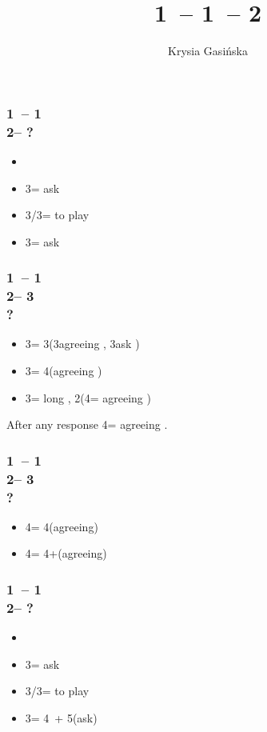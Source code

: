 \documentclass[12pt, a4paper]{report}
\title{1\diams\ -- 1\major\ -- 2\ntx}
\author{Krysia Gasińska}
\begin{document}
\maketitle

\subsubsection*{1\diams\ -- 1\hearts \\
                2\nt -- ?}
\begin{itemize}
    \item \pass
    \item 3\clubs = ask
    \item 3\diams/3\hearts = to play
    \item 3\spades = ask \clubs
\end{itemize}

\subsubsection*{1\diams\ -- 1\hearts \\
                2\nt -- 3\clubs\\
                ?}
\begin{itemize}
    \item 3\diams = 3\hearts (3\hearts agreeing \hearts, 3\spades ask \clubs)
    \item 3\hearts = 4\hearts (agreeing \hearts)
    \item 3\spades = long \diams, 2\hearts (4\clubs = agreeing \hearts)
\end{itemize}
After any response 4\diams = agreeing \diams.

\subsubsection*{1\diams\ -- 1\hearts \\
                2\nt -- 3\spades\\
                ?}
\begin{itemize}
    \item 4\clubs = 4\hearts (agreeing)
    \item 4\diams = 4+\clubs (agreeing)
\end{itemize}

\subsubsection*{1\diams\ -- 1\spades \\
                2\nt -- ?}
\begin{itemize}
    \item \pass
    \item 3\clubs = ask
    \item 3\diams/3\spades = to play
    \item 3\hearts = 4\hearts\ + 5\spades (ask)
\end{itemize}
\end{document}

